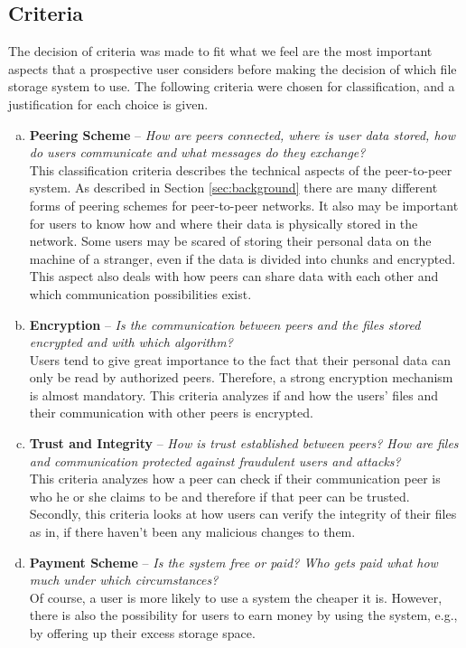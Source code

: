 \subsection{Criteria}
The decision of criteria was made to fit what we feel are the most important aspects that a prospective user considers before making the decision of which file storage system to use. The following criteria were chosen for classification, and a justification for each choice is given.

\begin{enumerate}[(a)]
\item \textbf{Peering Scheme} -- \textit{How are peers connected, where is user data stored, how do users communicate and what messages do they exchange?}\\
This classification criteria describes the technical aspects of the peer-to-peer system. As described in Section \ref{sec:background} there are many different forms of peering schemes for peer-to-peer networks. It also may be important for users to know how and where their data is physically stored in the network. Some users may be scared of storing their personal data on the machine of a stranger, even if the data is divided into chunks and encrypted. This aspect also deals with how peers can share data with each other and which communication possibilities exist. 

\item \textbf{Encryption} -- \textit{Is the communication between peers and the files stored encrypted and with which algorithm?}\\
Users tend to give great importance to the fact that their personal data can only be read by authorized peers. Therefore, a strong encryption mechanism is almost mandatory. This criteria analyzes if and how the users' files and their communication with other peers is encrypted.

\item \textbf{Trust and Integrity} -- \textit{How is trust established between peers? How are files and communication protected against fraudulent users and attacks?}\\
This criteria analyzes how a peer can check if their communication peer is who he or she claims to be and therefore if that peer can be trusted. Secondly, this criteria looks at how users can verify the integrity of their files as in, if there haven't been any malicious changes to them.

\item \textbf{Payment Scheme} -- \textit{Is the system free or paid? Who gets paid what how much under which circumstances?}\\
Of course, a user is more likely to use a system the cheaper it is. However, there is also the possibility for users to earn money by using the system, e.g., by offering up their excess storage space.


\end{enumerate}

